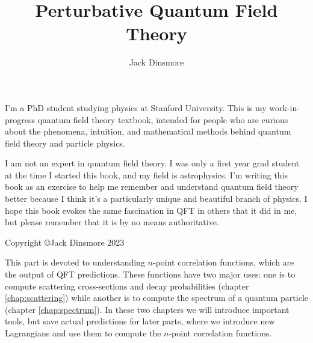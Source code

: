 \documentclass[11pt, a5paper]{memoir}
\title{Perturbative Quantum Field Theory}
\author{Jack Dinsmore}
\makeatletter
\let\LaTeXStandardPart\part
\newcommand{\unstarredpart@@noopt}[1]{
  \unstarredpart@@opt[#1]{#1}
}
\newcommand{\unstarredpart@@opt}[2][]{
  \cleardoublepage%
  \begingroup
  \let\newpage\relax
  \LaTeXStandardPart[#1]{#2}
  \endgroup
}
\newcommand{\starredpart}[1]{\LaTeXStandardPart*{#1}}
\newcommand{\unstarredpart}{\@ifnextchar[{\unstarredpart@@opt}{\unstarredpart@@noopt}}
\renewcommand{\part}{\@ifstar{\starredpart}{\unstarredpart}}
\newcounter{questioncounter}
\makeatother
\begin{document}
\setcounter{questioncounter}{1}

\frontmatter
\maketitle
\clearpage

\linespread{1.12}\selectfont
\begin{vplace}[0.7]
  \begin{adjustwidth}{0.5in}{0.5in}
    \centering
    \small 
    I'm a PhD student studying physics at Stanford University. This is my work-in-progress quantum field theory textbook, intended for people who are curious about the phenomena, intuition, and mathematical methods behind quantum field theory and particle physics. 
  
    \vspace{1cm}

    I am not an expert in quantum field theory. I was only a first year grad student at the time I started this book, and  my field is astrophysics. I'm writing this book as an exercise to help me remember and understand quantum field theory better because I think it's a particularly unique and beautiful branch of physics. I hope this book evokes the same fascination in QFT in others that it did in me, but please remember that it is by no means authoritative.
    
    \vspace{1cm}
  
    Copyright \copyright Jack Dinsmore 2023
  \end{adjustwidth}
\end{vplace}
\clearpage
\linespread{1.0}\selectfont

\tableofcontents
\clearpage
\linespread{1.12}\selectfont


\clearpage

\clearpage

\mainmatter


\part{Non-Perturbative Techniques}
This part is devoted to understanding $n$-point correlation functions, which are the output of QFT predictions. These functions have two major uses: one is to compute scattering cross-sections and decay probabilities (chapter \ref{chap:scattering}) while another is to compute the spectrum of a quantum particle (chapter \ref{chap:spectrum}). In these two chapters we will introduce important tools, but save actual predictions for later parts, where we introduce new Lagrangians and use them to compute the $n$-point correlation functions.
\end{document}
